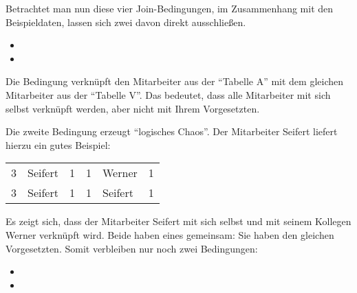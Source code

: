 Betrachtet man nun diese vier Join-Bedingungen, im Zusammenhang mit den Beispieldaten, lassen sich zwei davon direkt ausschließen.
\begin{itemize}
    \item {}
    \item {}
\end{itemize}
Die Bedingung  verknüpft den Mitarbeiter aus der \enquote{Tabelle A} mit dem gleichen Mitarbeiter aus der \enquote{Tabelle V}. Das bedeutet, dass alle Mitarbeiter mit sich selbst verknüpft werden, aber nicht mit Ihrem Vorgesetzten.

Die zweite Bedingung  erzeugt \enquote{logisches Chaos}. Der Mitarbeiter Seifert liefert hierzu ein gutes Beispiel:
\begin{center}
    \begin{small}
        \tablehead{}
        \tabletail {}
        \tablelasttail {}
        \begin{msoraclesql}
            \begin{supertabular}{rlrrlr}
                3 & Seifert & 1 & 1 & Werner & 1 \\
                3 & Seifert & 1 & 1 & Seifert & 1 \\
            \end{supertabular}
        \end{msoraclesql}
    \end{small}
\end{center}
Es zeigt sich, dass der Mitarbeiter Seifert mit sich selbst und mit seinem Kollegen Werner verknüpft wird. Beide haben eines gemeinsam: Sie haben den gleichen Vorgesetzten. Somit verbleiben nur noch zwei Bedingungen:
\begin{itemize}
    \item {}
    \item {}
\end{itemize}
